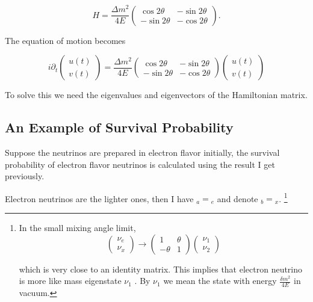 \documentclass{tufte-handout}
\begin{document}
\begin{equation}
H = \frac{\Delta m^2}{4E} \begin{pmatrix}
\cos 2\theta &  -  \sin 2\theta \\  - \sin 2\theta & - \cos 2\theta
\end{pmatrix}.
\end{equation}

The equation of motion becomes

\begin{equation}
i \partial_t \begin{pmatrix}
u(t) \\ v(t)
\end{pmatrix} = \frac{\Delta m^2}{4E} \begin{pmatrix}
\cos 2\theta &  -  \sin 2\theta \\  - \sin 2\theta & - \cos 2\theta
\end{pmatrix} \begin{pmatrix}
u(t) \\ v(t)
\end{pmatrix}
\end{equation}

To solve this we need the eigenvalues and eigenvectors of the Hamiltonian matrix.



\subsection{An Example of Survival Probability}

Suppose the neutrinos are prepared in electron flavor initially, the survival probability of electron flavor neutrinos is calculated using the result I get previously.

Electron neutrinos are the lighter ones, then I have ${}_a = {}_e$ and denote ${}_b={}_x$. \footnote{In the small mixing angle limit, 
\begin{equation*}
\begin{pmatrix}\nu_e \\ \nu_x\end{pmatrix} \to \begin{pmatrix}  1 & \theta \\ -\theta  & 1 \end{pmatrix}   \begin{pmatrix}\nu_1 \\ \nu_2\end{pmatrix}
\end{equation*}

which is very close to an identity matrix. This implies that electron neutrino is more like mass eigenstate  $\nu_1$ . By $\nu_1$ we mean the state with energy  $\frac{ \delta m^2 }{4E}$ in vacuum.
}
\end{document}

